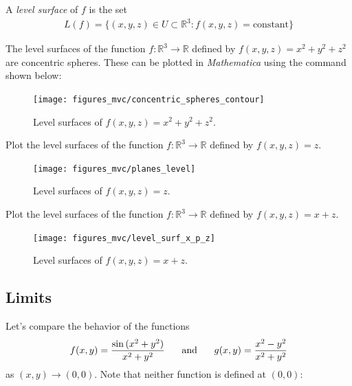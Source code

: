 \documentclass[12pt,letterpaper,reqno]{article}
\numberwithin{equation}{section}
\newcommand{\R}{\ensuremath{\mathbb R}}
\begin{document}
{\begin{defn}
A \emph{level surface} of $f$ is the set
\begin{align*}
	L(f)=\{(x,y,z) \in U \subset \mathbb{R}^3:f(x,y,z)=\text{constant}\}
\end{align*}	
\end{defn}
\newpage
\begin{example}
The level surfaces of the function $f:\R^3 \to \R$ defined by $f(x,y,z)=x^2+y^2+z^2$ are concentric spheres. These can be plotted in \emph{Mathematica} using the command shown below:
\begin{figure}[h]
	\begin{center}
		\texttt{[image: figures\_mvc/concentric\_spheres\_contour]}
	\end{center}
	\caption{Level surfaces of $f(x,y,z)=x^2+y^2+z^2$.}
\end{figure}
\end{example}
\newpage 
\begin{exercise}
Plot the level surfaces of the function $f:\R^3 \to \R$ defined by $f(x,y,z)=z$.	
\end{exercise}

{\color{red}
\begin{solution}
	\begin{figure}[h]
	\begin{center}
		\texttt{[image: figures\_mvc/planes\_level]}
	\end{center}
	\caption{Level surfaces of $f(x,y,z)=z$.}
\end{figure}
\end{solution}}

\begin{exercise}
Plot the level surfaces of the function $f:\R^3 \to \R$ defined by $f(x,y,z)=x+z$.	
\end{exercise}
{\color{red}
\begin{solution}
	\begin{figure}[h]
	\begin{center}
		\texttt{[image: figures\_mvc/level\_surf\_x\_p\_z]}
	\end{center}
	\caption{Level surfaces of $f(x,y,z)=x+z$.}
\end{figure}
\end{solution}}

\subsection{Limits}
Let's compare the behavior of the functions
\begin{align*}
	f(x,y)=\frac{\sin{(x^2+y^2)}}{x^2+y^2} \hspace{0.5cm} \text{ and } \hspace{0.5cm} g(x,y)=\frac{x^2-y^2}{x^2+y^2}
\end{align*}
as $(x,y) \to (0,0)$. Note that neither function is defined at $(0,0)$:

}
\end{document}
